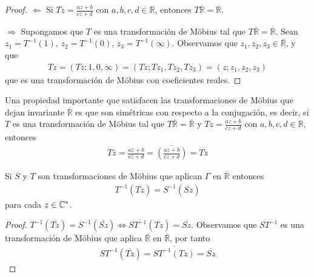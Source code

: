 \begin{proof}
    $\Longleftarrow$ Si $Tz = \frac{az + b}{cz + d}$ con $a,b,c,d \in \mathbb{R}$, entonces $T\overline{\mathbb{R}} = \overline{\mathbb{R}}$.

    $\Longrightarrow$ Supongamos que $T$ es una transformación de M\"obius tal que $T\overline{\mathbb{R}} = \overline{\mathbb{R}}$. Sean $z_1 = T^{-1}(1)$, $z_2 = T^{-1}(0)$, $z_3 = T^{-1}(\infty)$. Observamos que $z_1,z_2,z_3 \in \overline{\mathbb{R}}$, y que
    \begin{align*}
        Tz = (Tz;1,0,\infty) = (Tz;Tz_1, Tz_2, Tz_3) = (z;z_1,z_2,z_3)
    \end{align*}
    que es una transformación de M\"obius con coeficientes reales.
\end{proof}
Una propiedad importante que satisfacen las transformaciones de M\"obius que dejan invariante $\overline{\mathbb{R}}$ es que son simétricas con respecto a la conjugación, es decir, si $T$ es una transformación de M\"obius tal que $T\overline{\mathbb{R}} = \overline{\mathbb{R}}$ y $Tz = \frac{az + b}{cz + d}$ con $a,b,c,d \in \mathbb{R}$, entonces
\begin{align*}
    T\overline{z} = \frac{a\overline{z} + b}{c\overline{z} + d} = \overline{\left( \frac{az + b}{cz + d} \right)} = \overline{Tz}
\end{align*}
\begin{teo}
    Si $S$ y $T$ son transformaciones de M\"obius que aplican $\Gamma$ en $\overline{\mathbb{R}}$ entonces
    \begin{align*}
        T^{-1}(\overline{Tz}) = S^{-1}(\overline{Sz})
    \end{align*}
    para cada $z \in \mathbb{C}^*$.
\end{teo}

\begin{proof}
    $T^{-1}(\overline{Tz}) = S^{-1}(\overline{Sz}) \Longleftrightarrow ST^{-1}(\overline{Tz}) = \overline{Sz}$. Observamos que $ST^{-1}$ es una transformación de M\"obius que aplica $\overline{\mathbb{R}}$ en $\overline{\mathbb{R}}$, por tanto
    \begin{align*}
        ST^{-1}(\overline{Tz}) = \overline{ST^{-1}(Tz)} = \overline{Sz}
    \end{align*}
\end{proof}

